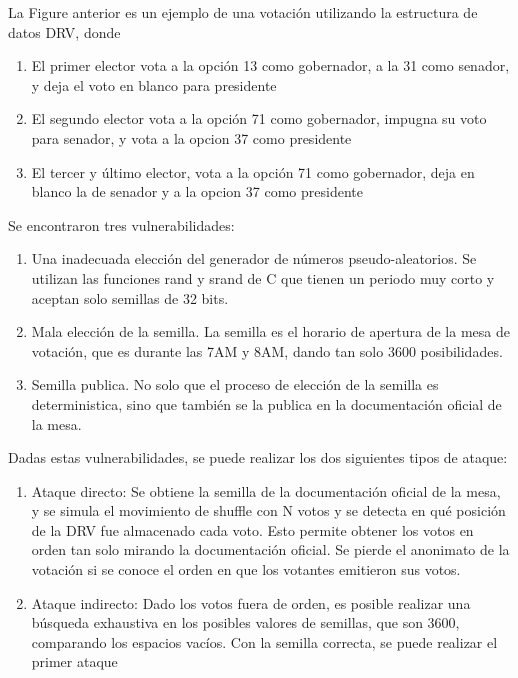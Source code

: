 La Figure anterior es un ejemplo de una votación utilizando la estructura de datos DRV, donde
\begin{enumerate}
	\item El primer elector vota a la opción 13 como gobernador, a la 31 como senador, y deja el voto en blanco para presidente
	\item El segundo elector vota a la opción 71 como gobernador, impugna su voto para senador, y vota a la opcion 37 como presidente
	\item El tercer y último elector, vota a la opción 71 como gobernador, deja en blanco la de senador y a la opcion 37 como presidente
\end{enumerate}

Se encontraron tres vulnerabilidades:
\begin{enumerate}
	\item Una inadecuada elección del generador de números pseudo-aleatorios. Se utilizan las funciones rand y srand de C que tienen un periodo muy corto y aceptan solo semillas de 32 bits.
	\item Mala elección de la semilla. La semilla es el horario de apertura de la mesa de votación, que es durante las 7AM y 8AM, dando tan solo 3600 posibilidades.
	\item Semilla publica. No solo que el proceso de elección de la semilla es deterministica, sino que también se la publica en la documentación oficial de la mesa.
\end{enumerate}

Dadas estas vulnerabilidades, se puede realizar los dos siguientes tipos de ataque:
\begin{enumerate}
	\item Ataque directo: Se obtiene la semilla de la documentación oficial de la mesa, y se simula el movimiento de shuffle con N votos y se detecta en qué posición de la DRV fue almacenado cada voto. Esto permite obtener los votos en orden tan solo mirando la documentación oficial. Se pierde el anonimato de la votación si se conoce el orden en que los votantes emitieron sus votos.
	\item Ataque indirecto: Dado los votos fuera de orden, es posible realizar una búsqueda exhaustiva en los posibles valores de semillas, que son 3600, comparando los espacios vacíos.  Con la semilla correcta, se puede realizar el primer ataque
\end{enumerate}

